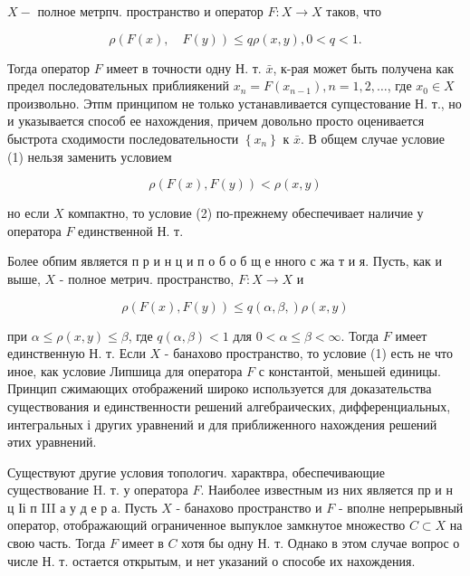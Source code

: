 \documentclass[10pt]{article}
\begin{document}
$X-$ полное метрпч. пространство и оператор $F: X \rightarrow X$ таков, что



\[

\rho(F(x), \quad F(y)) \leqslant q \rho(x, y), 0<q<1 .

\]



Тогда оператор $F$ имеет в точности одну Н. т. $\bar{x}$, к-рая может быть получена как предел последовательных приблиякений $x_{n}=F\left(x_{n-1}\right), n=1,2, \ldots$, где $x_{0} \in X$ произвольно. Этпм принципом не только устанавливается супцестование Н. т., но и указывается способ ее нахождения, причем довольно просто оценивается быстрота сходимости последовательности $\left\{x_{n}\right\}$ к $\bar{x}$. В общем случае условие (1) нельзя заменить условием



\[

\rho(F(x), F(y))<\rho(x, y)

\]



но если $X$ компактно, то условие (2) по-прежнему обеспечивает наличие у оператора $F$ единственной Н. т.



Более обпим является п р и н ц и п о б о б щ е нного с жа т и я. Пусть, как и выше, $X$ - полное метрич. пространство, $F: X \rightarrow X$ и



\[

\rho(F(x), F(y)) \leqslant q(\alpha, \beta,) \rho(x, y)

\]



при $\alpha \leqslant \rho(x, y) \leqslant \beta$, где $q(\alpha, \beta)<1$ для $0<\alpha \leqslant \beta<\infty$. Тогда $F$ имеет единственную Н. т. Если $X$ - банахово пространство, то условие (1) есть не что иное, как условие Липшица для оператора $F$ с константой, меньшей единицы. Принцип сжимающих отображений широко используется для доказательства существования и единственности решений алгебраических, дифференциальных, интегральных і других уравнений и для приближенного нахождения решений әтих уравнений.



Существуют другие условия топологич. характвра, обеспечивающие существование H. т. у оператора $F$. Наиболее известным из них является пр и н ц Іі п III а у д е р а. Пусть $X$ - банахово пространство и $F$ - вполне непрерывный оператор, отображающий ограниченное выпуклое замкнутое множество $C \subset X$ на свою часть. Тогда $F$ имеет в $C$ хотя бы одну Н. т. Однако в этом случае вопрос о числе Н. т. остается открытым, и нет указаний о способе их нахождения.
\end{document}

